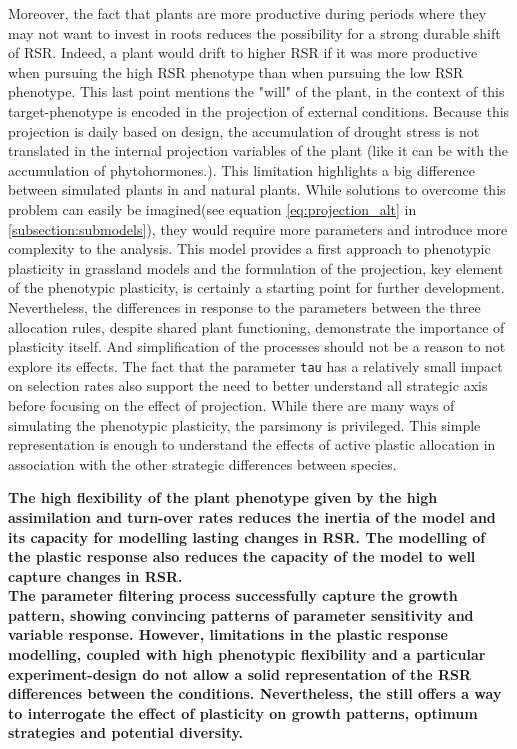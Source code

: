 Moreover, the fact that plants are more productive during periods where they may not want to invest in roots reduces the possibility for a strong durable shift of RSR. Indeed, a plant would drift to higher RSR if it was more productive when pursuing the high RSR phenotype than when pursuing the low RSR phenotype. This last point mentions the "will" of the plant, in the context of \model this target-phenotype is encoded in the projection of external conditions. Because this projection is daily based on design, the accumulation of drought stress is not translated in the internal projection variables of the plant (like it can be with the accumulation of phytohormones.). This limitation highlights a big difference between simulated plants in \model and natural plants. While solutions to overcome this problem can easily be imagined(see equation \ref{eq:projection_alt} in \ref{subsection:submodels}), they would require more parameters and introduce more complexity to the analysis. This model provides a first approach to phenotypic plasticity in grassland models and the formulation of the projection, key element of the phenotypic plasticity, is certainly a starting point for further development. Nevertheless, the differences in response to the parameters between the three allocation rules, despite shared plant functioning, demonstrate the importance of plasticity itself. And simplification of the processes should not be a reason to not explore its effects. The fact that the parameter \texttt{tau} has a relatively small impact on selection rates also support the need to better understand all strategic axis before focusing on the effect of projection. While there are many ways of simulating the phenotypic plasticity, the parsimony is privileged. This simple representation is enough to understand the effects of active plastic allocation in association with the other strategic differences between species.

\textbf{The high flexibility of the plant phenotype given by the high assimilation and turn-over rates reduces the inertia of the model and its capacity for modelling lasting changes in RSR. The modelling of the plastic response also reduces the capacity of the model to well capture changes in RSR. }\\

\textbf{The parameter filtering process successfully capture the growth pattern, showing convincing patterns of parameter sensitivity and variable response. However, limitations in the plastic response modelling, coupled with high phenotypic flexibility and a particular experiment-design do not allow a solid representation of the RSR differences between the conditions. Nevertheless, the \model still offers a way to interrogate the effect of plasticity on growth patterns, optimum strategies and potential diversity.}


